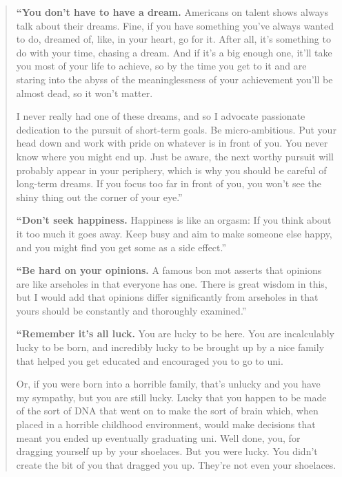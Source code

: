 \thispagestyle{empty}

\begin{quotation} \centering\small%



\textbf{``You don’t have to have a dream.}
Americans on talent shows always talk about their dreams. Fine, if you have something you’ve always wanted to do, dreamed of, like, in your heart, go for it. After all, it’s something to do with your time, chasing a dream. And if it’s a big enough one, it’ll take you most of your life to achieve, so by the time you get to it and are staring into the abyss of the meaninglessness of your achievement you’ll be almost dead, so it won’t matter.

I never really had one of these dreams, and so I advocate passionate dedication to the pursuit of short-term goals. Be micro-ambitious. Put your head down and work with pride on whatever is in front of you. You never know where you might end up. Just be aware, the next worthy pursuit will probably appear in your periphery, which is why you should be careful of long-term dreams. If you focus too far in front of you, you won’t see the shiny thing out the corner of your eye.''\medskip

\textbf{``Don’t seek happiness.} 	
Happiness is like an orgasm: If you think about it too much it goes away. Keep busy and aim to make someone else happy, and you might find you get some as a side effect.''\medskip

\textbf{ ``Be hard on your opinions.}
%
A famous bon mot asserts that opinions are like arseholes in that everyone has one. There is great wisdom in this, but I would add that opinions differ significantly from arseholes in that yours should be constantly and thoroughly examined.''\bigskip
	
\textbf{``Remember it’s all luck.}	
You are lucky to be here. You are incalculably lucky to be born, and incredibly lucky to be brought up by a nice family that helped you get educated and encouraged you to go to uni.

Or, if you were born into a horrible family, that's unlucky and you have my sympathy, but you are still lucky. Lucky that you happen to be made of the sort of DNA that went on to make the sort of brain which, when placed in a horrible childhood environment, would make decisions that meant you ended up eventually graduating uni. Well done, you, for dragging yourself up by your shoelaces. But you were lucky. You didn't create the bit of you that dragged you up. They're not even your shoelaces.


\end{quotation}
